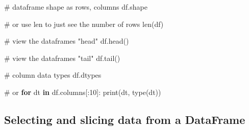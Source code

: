 \documentclass[
  letterpaper,
  DIV=11,
  numbers=noendperiod]{scrreprt}
\newenvironment{Shaded}{\begin{snugshade}}{\end{snugshade}}
\newcommand{\BuiltInTok}[1]{\textcolor[rgb]{0.00,0.23,0.31}{#1}}
\newcommand{\CommentTok}[1]{\textcolor[rgb]{0.37,0.37,0.37}{#1}}
\newcommand{\ControlFlowTok}[1]{\textcolor[rgb]{0.00,0.23,0.31}{\textbf{#1}}}
\newcommand{\DecValTok}[1]{\textcolor[rgb]{0.68,0.00,0.00}{#1}}
\newcommand{\KeywordTok}[1]{\textcolor[rgb]{0.00,0.23,0.31}{\textbf{#1}}}
\newcommand{\NormalTok}[1]{\textcolor[rgb]{0.00,0.23,0.31}{#1}}
\begin{document}
\begin{Shaded}
\begin{Highlighting}[]
\CommentTok{\# dataframe shape as rows, columns}
\NormalTok{df.shape}
\end{Highlighting}
\end{Shaded}

\begin{Shaded}
\begin{Highlighting}[]
\CommentTok{\# or use len to just see the number of rows}
\BuiltInTok{len}\NormalTok{(df)}
\end{Highlighting}
\end{Shaded}

\begin{Shaded}
\begin{Highlighting}[]
\CommentTok{\# view the dataframe\textquotesingle{}s "head"}
\NormalTok{df.head()}
\end{Highlighting}
\end{Shaded}

\begin{Shaded}
\begin{Highlighting}[]
\CommentTok{\# view the dataframe\textquotesingle{}s "tail"}
\NormalTok{df.tail()}
\end{Highlighting}
\end{Shaded}

\begin{Shaded}
\begin{Highlighting}[]
\CommentTok{\# column data types}
\NormalTok{df.dtypes}
\end{Highlighting}
\end{Shaded}

\begin{Shaded}
\begin{Highlighting}[]
\CommentTok{\# or}
\ControlFlowTok{for}\NormalTok{ dt }\KeywordTok{in}\NormalTok{ df.columns[:}\DecValTok{10}\NormalTok{]:}
    \BuiltInTok{print}\NormalTok{(dt, }\BuiltInTok{type}\NormalTok{(dt))}
\end{Highlighting}
\end{Shaded}

\subsection{Selecting and slicing data from a
DataFrame}\label{selecting-and-slicing-data-from-a-dataframe}
\end{document}
